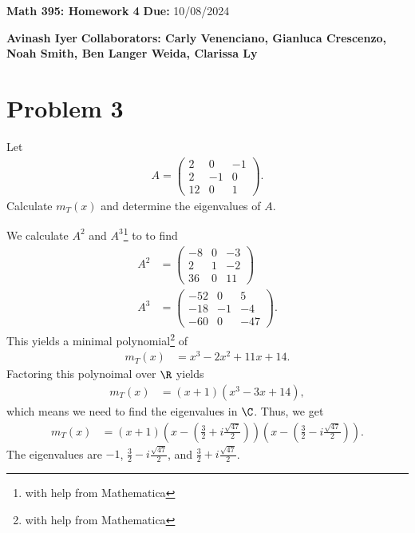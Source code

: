 \documentclass[8pt]{mypackage}
\begin{document}
\begin{center}
  \textbf{Math 395: Homework 4}\break
  \textbf{Due:}  10/08/2024\break
  
  \textbf{Avinash Iyer}\break
  \textbf{Collaborators: Carly Venenciano, Gianluca Crescenzo, Noah Smith, Ben Langer Weida, Clarissa Ly}
\end{center}
\RaggedRight
\section{Problem 3}%
\begin{problem}
  Let
  \begin{align*}
    A = \begin{pmatrix}2 & 0 & -1 \\ 2 & -1 & 0 \\ 12 & 0 & 1\end{pmatrix}.
  \end{align*}
  Calculate $m_T(x)$ and determine the eigenvalues of $A$.
\end{problem}
\begin{solution}
  We calculate $A^2$ and $A^3$\footnote{with help from Mathematica} to to find
  \begin{align*}
    A^2 &= \begin{pmatrix}-8 & 0 & -3 \\ 2 & 1 & -2 \\ 36 & 0 & 11\end{pmatrix}\\
    A^3 &= \begin{pmatrix}-52 & 0 & 5 \\ -18 & -1 & -4 \\ -60 & 0 & -47\end{pmatrix}.
  \end{align*}
  This yields a minimal polynomial\footnote{with help from Mathematica} of
  \begin{align*}
    m_T(x) &= x^3 - 2x^2 + 11x + 14.
  \end{align*}
  Factoring this polynoimal over $\R$ yields
  \begin{align*}
    m_T(x) &= (x+1)\left(x^3 - 3x + 14\right),
  \end{align*}
  which means we need to find the eigenvalues in $\C$. Thus, we get
  \begin{align*}
    m_T(x) &= \left(x+1\right)\left(x - \left(\frac{3}{2} + i\frac{\sqrt{47}}{2}\right)\right)\left(x - \left(\frac{3}{2} - i\frac{\sqrt{47}}{2}\right)\right).
  \end{align*}
  The eigenvalues are $-1$, $\frac{3}{2}-i\frac{\sqrt{47}}{2}$, and $\frac{3}{2} + i\frac{\sqrt{47}}{2}$.
\end{solution}
\end{document}
